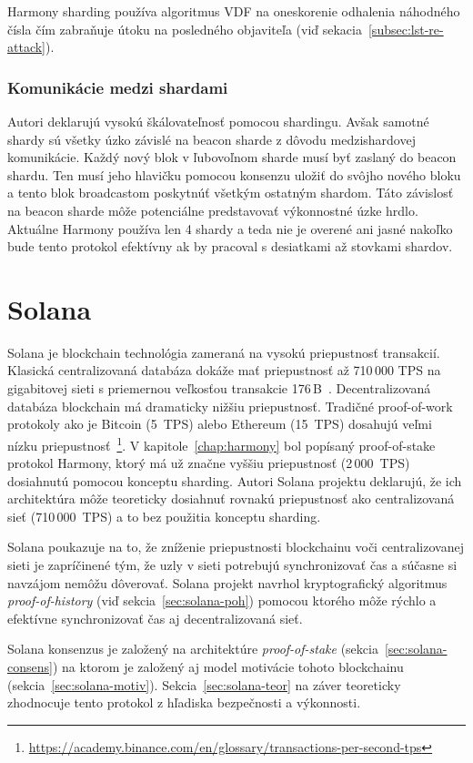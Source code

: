 Harmony sharding používa algoritmus VDF na oneskorenie odhalenia náhodného čísla čím zabraňuje útoku na posledného objaviteľa (viď sekacia~\ref{subsec:lst-re-attack}).

\subsection{Komunikácie medzi shardami}
Autori deklarujú vysokú škálovateľnosť pomocou shardingu. Avšak samotné shardy sú všetky úzko závislé na beacon sharde z dôvodu medzishardovej komunikácie. Každý nový blok v ľubovoľnom sharde musí byť zaslaný do beacon shardu. Ten musí jeho hlavičku pomocou konsenzu uložiť do svôjho nového bloku a tento blok broadcastom poskytnúť všetkým ostatným shardom. Táto závislosť na beacon sharde môže potenciálne predstavovať výkonnostné úzke hrdlo. Aktuálne Harmony používa len 4 shardy a teda nie je overené ani jasné nakoľko bude tento protokol efektívny ak by pracoval s desiatkami až stovkami shardov.

\chapter{Solana}

Solana je blockchain technológia zameraná na vysokú priepustnosť transakcií. Klasická centralizovaná databáza dokáže mať priepustnosť až 710\,000 TPS na gigabitovej sieti s priemernou veľkosťou transakcie 176\,B~\cite{solanaDoc}. Decentralizovaná databáza blockchain má dramaticky nižšiu priepustnosť. Tradičné proof-of-work protokoly ako je Bitcoin (5~TPS) alebo Ethereum (15~TPS) dosahujú veľmi nízku priepustnosť~\footnote{\url{https://academy.binance.com/en/glossary/transactions-per-second-tps}}.  V kapitole~\ref{chap:harmony} bol popísaný proof-of-stake protokol Harmony, ktorý má už značne vyššiu priepustnosť (2\,000~TPS) dosiahnutú pomocou konceptu sharding.  Autori Solana projektu deklarujú, že ich architektúra môže teoreticky dosiahnuť rovnakú priepustnosť ako centralizovaná sieť (710\,000~TPS) a to bez použitia konceptu sharding.

Solana poukazuje na to, že zníženie priepustnosti blockchainu voči centralizovanej sieti je zapríčinené tým, že uzly v sieti potrebujú synchronizovať čas a súčasne si navzájom nemôžu dôverovať. Solana projekt navrhol kryptografický algoritmus \textit{proof-of-history} (viď sekcia~\ref{sec:solana-poh}) pomocou ktorého môže rýchlo a efektívne synchronizovať čas aj decentralizovaná sieť.

Solana konsenzus je založený na architektúre \textit{proof-of-stake} (sekcia~\ref{sec:solana-consens}) na ktorom je založený aj model motivácie tohoto blockchainu (sekcia~\ref{sec:solana-motiv}). Sekcia~\ref{sec:solana-teor} na záver teoreticky zhodnocuje tento protokol z hľadiska bezpečnosti a výkonnosti.

